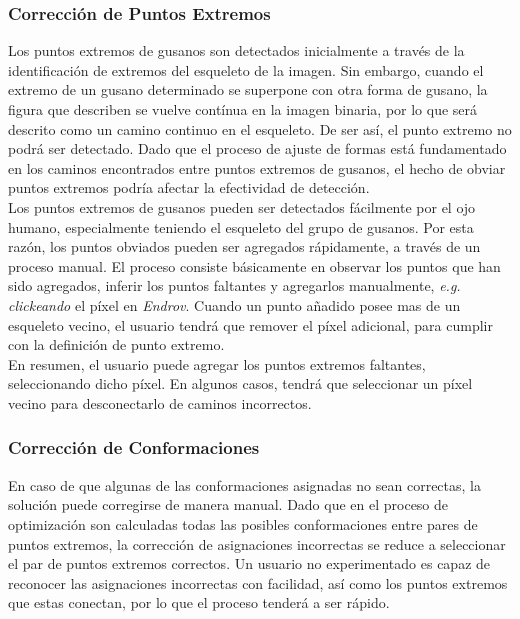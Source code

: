 \subsubsection{Correcci\'on de Puntos Extremos}
\label{sec:endpointop}

Los puntos extremos de gusanos son detectados inicialmente a trav\'es de la
identificaci\'on de extremos del esqueleto de la imagen. Sin embargo, cuando
el extremo de un gusano determinado se superpone con otra forma de gusano, la
figura que describen se vuelve cont\'inua en la imagen binaria, por lo que ser\'a
descrito como un camino continuo en el esqueleto. De ser as\'i, el punto 
extremo no podr\'a ser detectado. Dado que el proceso de ajuste de formas est\'a 
fundamentado en los caminos encontrados entre puntos extremos de gusanos, el hecho de obviar
puntos extremos podr\'ia afectar la efectividad de detecci\'on.\\

Los puntos extremos de gusanos pueden ser detectados f\'acilmente por el ojo humano, 
especialmente teniendo el esqueleto del grupo de gusanos. Por esta raz\'on, los puntos
obviados pueden ser agregados r\'apidamente, a trav\'es de un proceso manual. El proceso
consiste b\'asicamente en observar los puntos que han sido agregados, inferir los
puntos faltantes y agregarlos manualmente, \emph{e.g.} \emph{clickeando} el p\'ixel
en \emph{Endrov}. Cuando un punto a\~nadido posee mas de un esqueleto vecino, el
usuario tendr\'a que remover el p\'ixel adicional, para cumplir con la
definici\'on de punto extremo.\\

En resumen, el usuario puede agregar los puntos extremos faltantes, seleccionando
dicho p\'ixel. En algunos casos, tendr\'a que seleccionar un p\'ixel vecino para
desconectarlo de caminos incorrectos.

\subsubsection{Correcci\'on de Conformaciones}
\label{sec:matchfix}

En caso de que algunas de las conformaciones asignadas no sean correctas,
la soluci\'on puede corregirse de manera manual. Dado que en el proceso de
optimizaci\'on son calculadas todas las posibles conformaciones entre
pares de puntos extremos, la correcci\'on de asignaciones incorrectas
se reduce a seleccionar el par de puntos extremos correctos. 
Un usuario no experimentado es capaz de reconocer las asignaciones incorrectas
con facilidad, as\'i como los puntos extremos que estas conectan, por lo que
el proceso tender\'a a ser r\'apido.
